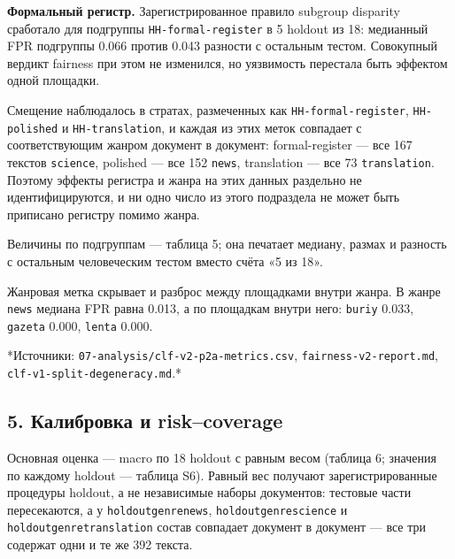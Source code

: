 \documentclass[11pt,a4paper]{article}
\renewcommand{\_}{\textunderscore\allowbreak}
\begin{document}
\textbf{Формальный регистр.} Зарегистрированное правило subgroup disparity сработало
для подгруппы \texttt{HH-\allowbreak{}formal-\allowbreak{}register} в 5 holdout из 18: медианный FPR подгруппы
0.066 против 0.043 разности с остальным тестом. Совокупный вердикт fairness при
этом не изменился, но уязвимость перестала быть эффектом одной площадки.

Смещение наблюдалось в стратах, размеченных как \texttt{HH-\allowbreak{}formal-\allowbreak{}register},
\texttt{HH-\allowbreak{}polished} и \texttt{HH-\allowbreak{}translation}, и каждая из этих меток совпадает с
соответствующим жанром документ в документ: formal-register — все 167 текстов
\texttt{science}, polished — все 152 \texttt{news}, translation — все 73 \texttt{translation}. Поэтому
эффекты регистра и жанра на этих данных раздельно не идентифицируются, и ни одно
число из этого подраздела не может быть приписано регистру помимо жанра.

Величины по подгруппам — таблица 5; она печатает медиану, размах и разность с
остальным человеческим тестом вместо счёта «5 из 18».

\setcounter{table}{4}


Жанровая метка скрывает и разброс между площадками внутри жанра. В жанре \texttt{news}
медиана FPR равна 0.013, а по площадкам внутри него: \texttt{buriy\_2014} 0.033, \texttt{gazeta}
0.000, \texttt{lenta} 0.000.

*Источники: \texttt{07-\allowbreak{}analysis/clf-\allowbreak{}v2-\allowbreak{}p2a-\allowbreak{}metrics.csv}, \texttt{fairness-\allowbreak{}v2-\allowbreak{}report.md},
\texttt{clf-\allowbreak{}v1-\allowbreak{}split-\allowbreak{}degeneracy.md}.*

\subsection{5. Калибровка и risk–coverage}

Основная оценка — macro по 18 holdout с равным весом (таблица 6; значения по
каждому holdout — таблица S6). Равный вес получают
зарегистрированные процедуры holdout, а не независимые наборы документов: тестовые
части пересекаются, а у \texttt{holdout\_genre\_news}, \texttt{holdout\_genre\_science} и
\texttt{holdout\_genre\_translation} состав совпадает документ в документ — все три содержат
одни и те же 392 текста.

\setcounter{table}{5}

\end{document}
